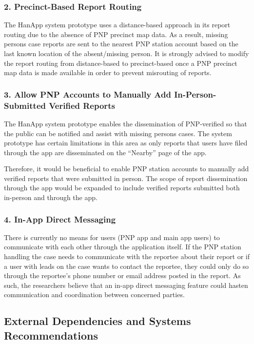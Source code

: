 \subsubsection{2. Precinct-Based Report Routing}

The HanApp system prototype uses a distance-based approach in its report routing due to the absence of PNP precinct map data. As a result, missing persons case reports are sent to the nearest PNP station account based on the last known location of the absent/missing person. It is strongly advised to modify the report routing from distance-based to precinct-based once a PNP precinct map data is made available in order to prevent misrouting of reports. 

\subsubsection{3. Allow PNP Accounts to Manually Add In-Person-Submitted Verified Reports}
The HanApp system prototype enables the dissemination of PNP-verified so that the public can be notified and assist with missing persons cases. The system prototype has certain limitations in this area as only reports that users have filed through the app are disseminated on the “Nearby” page of the app.

Therefore, it would be beneficial to enable PNP station accounts to manually add verified reports that were submitted in person. The scope of report dissemination through the app would be expanded to include verified reports submitted both in-person and through the app.


\subsubsection{4. In-App Direct Messaging}
There is currently no means for users (PNP app and main app users) to communicate with each other through the application itself. If the PNP station handling the case needs to communicate with the reportee about their report or if a user with leads on the case wants to contact the reportee, they could only do so through the reportee’s phone number or email address posted in the report. As such, the researchers believe that an in-app direct messaging feature could hasten communication and coordination between concerned parties.

\subsection{External Dependencies and Systems Recommendations}

